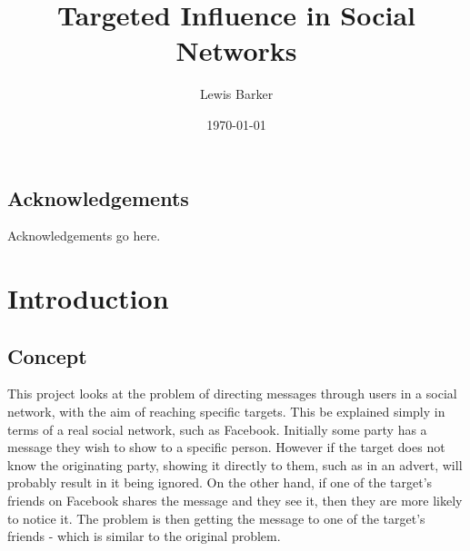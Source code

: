 \documentclass[bsc,frontabs,twoside,singlespacing,parskip,deptreport]{infthesis}     %
\begin{document}
\title{Targeted Influence in Social Networks}

\author{Lewis Barker}



\date{\today}


\maketitle

\section*{Acknowledgements}
Acknowledgements go here. 

\tableofcontents



\chapter{Introduction}
\section{Concept}
This project looks at the problem of directing messages through users in a social network, with the aim of reaching specific targets. This be explained simply in terms of a real social network, such as Facebook. Initially some party has a message they wish to show to a specific person. However if the target does not know the originating party, showing it directly to them, such as in an advert, will probably result in it being ignored. On the other hand, if one of the target's friends on Facebook shares the message and they see it, then they are more likely to notice it. The problem is then getting the message to one of the target's friends - which is similar to the original problem.
\end{document}
